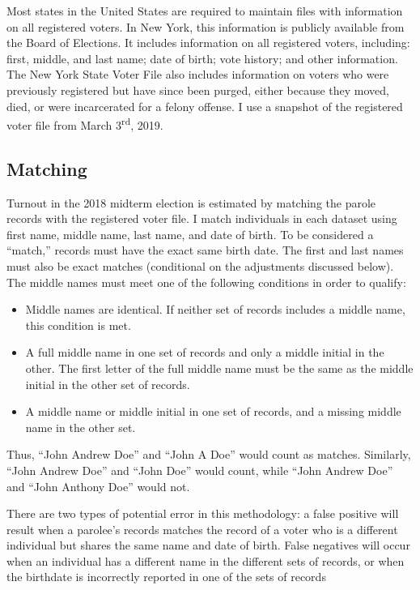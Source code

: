 \documentclass[
  12pt,
]{article}
\providecommand{\tightlist}{%
  \setlength{\itemsep}{0pt}\setlength{\parskip}{0pt}}
\begin{document}
Most states in the United States are required to maintain files with information on all registered voters. In New York, this information is publicly available from the Board of Elections. It includes information on all registered voters, including: first, middle, and last name; date of birth; vote history; and other information. The New York State Voter File also includes information on voters who were previously registered but have since been purged, either because they moved, died, or were incarcerated for a felony offense. I use a snapshot of the registered voter file from March 3\textsuperscript{rd}, 2019.

\hypertarget{matching}{%
\subsection*{Matching}\label{matching}}

Turnout in the 2018 midterm election is estimated by matching the parole records with the registered voter file. I match individuals in each dataset using first name, middle name, last name, and date of birth. To be considered a ``match,'' records must have the exact same birth date. The first and last names must also be exact matches (conditional on the adjustments discussed below). The middle names must meet one of the following conditions in order to qualify:

\begin{itemize}
\tightlist
\item
  Middle names are identical. If neither set of records includes a middle name, this condition is met.
\item
  A full middle name in one set of records and only a middle initial in the other. The first letter of the full middle name must be the same as the middle initial in the other set of records.
\item
  A middle name or middle initial in one set of records, and a missing middle name in the other set.
\end{itemize}

Thus, ``John Andrew Doe'' and ``John A Doe'' would count as matches. Similarly, ``John Andrew Doe'' and ``John Doe'' would count, while ``John Andrew Doe'' and ``John Anthony Doe'' would not.

There are two types of potential error in this methodology: a false positive will result when a parolee's records matches the record of a voter who is a different individual but shares the same name and date of birth. False negatives will occur when an individual has a different name in the different sets of records, or when the birthdate is incorrectly reported in one of the sets of records
\end{document}
